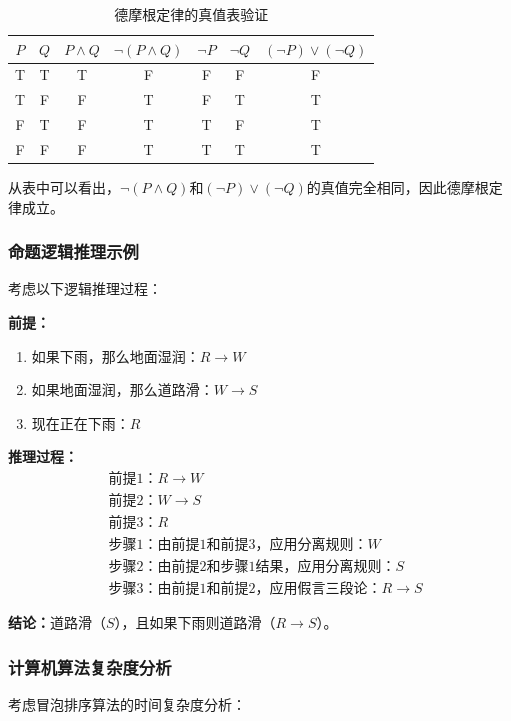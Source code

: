 \documentclass{article}
\begin{document}
\begin{table}[h]
\centering
\begin{tabular}{|c|c|c|c|c|c|c|}
\hline
$P$ & $Q$ & $P \land Q$ & $\neg(P \land Q)$ & $\neg P$ & $\neg Q$ & $(\neg P) \lor (\neg Q)$ \\
\hline
T & T & T & F & F & F & F \\
T & F & F & T & F & T & T \\
F & T & F & T & T & F & T \\
F & F & F & T & T & T & T \\
\hline
\end{tabular}
\caption{德摩根定律的真值表验证}
\end{table}

从表中可以看出，$\neg(P \land Q)$和$(\neg P) \lor (\neg Q)$的真值完全相同，因此德摩根定律成立。

\subsubsection{命题逻辑推理示例}

考虑以下逻辑推理过程：

\textbf{前提：}
\begin{enumerate}
\item 如果下雨，那么地面湿润：$R \rightarrow W$
\item 如果地面湿润，那么道路滑：$W \rightarrow S$
\item 现在正在下雨：$R$
\end{enumerate}

\textbf{推理过程：}
\begin{align}
&\text{前提1：} R \rightarrow W \\
&\text{前提2：} W \rightarrow S \\
&\text{前提3：} R \\
&\text{步骤1：由前提1和前提3，应用分离规则：} W \\
&\text{步骤2：由前提2和步骤1结果，应用分离规则：} S \\
&\text{步骤3：由前提1和前提2，应用假言三段论：} R \rightarrow S
\end{align}

\textbf{结论：}道路滑（$S$），且如果下雨则道路滑（$R \rightarrow S$）。

\subsubsection{计算机算法复杂度分析}

考虑冒泡排序算法的时间复杂度分析：
\end{document}
